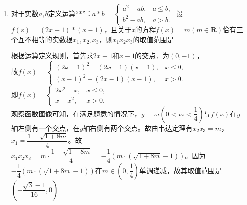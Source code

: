 \begin{enumerate}
    \item 对于实数$a, b$定义运算“*”：$a*b = \left\{  
         \begin{array}{ll}  
            a^2 - ab, & a \leq b, \\  
            b^2 - ab, & a > b.
         \end{array}
    \right.$ 设$f(x) = (2x-1) * (x-1)$，且关于$x$的方程$f(x) = m (m \in \mathbf{R})$恰有三个互不相等的实数根$x_1, x_2, x_3$，则$x_1x_2x_3$的取值范围是
    \begin{jieda}
        根据运算定义规则，首先求$2x-1$和$x-1$的交点，为$(0, -1)$，\\
        故$f(x) = \left\{ 
                 \begin{array}{ll}  
                    (2x-1)^2 - (2x-1)(x-1), & x \leq 0, \\  
                    (x-1)^2 - (2x-1)(x-1), & x > 0.
                 \end{array}
                \right. $ \\
        即$f(x) = \left\{ 
                 \begin{array}{ll}  
                    2x^2-x, & x \leq 0, \\  
                    x-x^2, & x > 0.
                 \end{array}
                \right. $ \\
        观察函数图像可知，在满足题意的情况下，$y = m \left(0 < m < \dfrac{1}{4}\right)$与$f(x)$在$y$轴左侧有一个交点，在$y$轴右侧有两个交点。故由韦达定理有$x_2x_3 = m$，$x_1 = \dfrac{1-\sqrt{1+8m}}{4}$。故$x_1x_2x_3 = m \cdot \dfrac{1-\sqrt{1+8m}}{4} = -\dfrac{1}{4}(m \cdot (\sqrt{1+8m} - 1))$。因为$-\dfrac{1}{4}(m \cdot (\sqrt{1+8m} - 1))$在$m \in \left(0, \dfrac{1}{4}\right)$单调递减，故其取值范围是$\left(-\dfrac{\sqrt{3} - 1}{16}, 0\right)$
    \end{jieda}
\end{enumerate}
